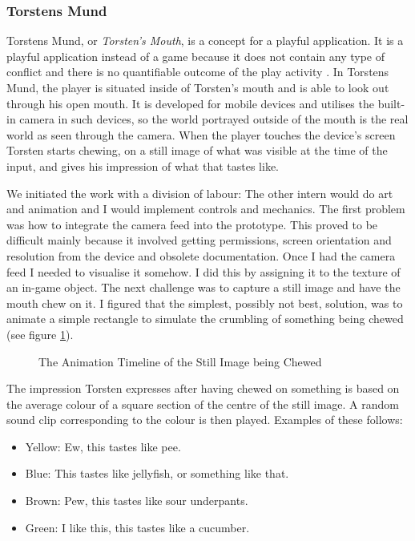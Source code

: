 \subsubsection{Torstens Mund}
Torstens Mund, or \textit{Torsten's Mouth}, is a concept for a playful application. It is a playful application instead of a game because it does not contain any type of conflict and there is no quantifiable outcome of the play activity \cite[ch. 7, p. 11]{salen}. In Torstens Mund, the player is situated inside of Torsten's mouth and is able to look out through his open mouth. It is developed for mobile devices and utilises the built-in camera in such devices, so the world portrayed outside of the mouth is the real world as seen through the camera. When the player touches the device's screen Torsten starts chewing, on a still image of what was visible at the time of the input, and gives his impression of what that tastes like.

We initiated the work with a division of labour: The other intern would do art and animation and I would implement controls and mechanics. The first problem was how to integrate the camera feed into the prototype. This proved to be difficult mainly because it involved getting permissions, screen orientation and resolution from the device and obsolete documentation. Once I had the camera feed I needed to visualise it somehow. I did this by assigning it to the texture of an in-game object. The next challenge was to capture a still image and have the mouth chew on it. I figured that the simplest, possibly not best, solution, was to animate a simple rectangle to simulate the crumbling of something being chewed (see figure \ref{ChewAni}).
\begin{center}
  \begin{figure}[!htb]
    \noindent{}
    \caption{The Animation Timeline of the Still Image being Chewed}
    \label{ChewAni}
  \end{figure}
\end{center}
The impression Torsten expresses after having chewed on something is based on the average colour of a square section of the centre of the still image. A random sound clip corresponding to the colour is then played. Examples of these follows:
\begin{itemize}
  \item Yellow: Ew, this tastes like pee.
  \item Blue: This tastes like jellyfish, or something like that.
  \item Brown: Pew, this tastes like sour underpants.
  \item Green: I like this, this tastes like a cucumber.
\end{itemize}
